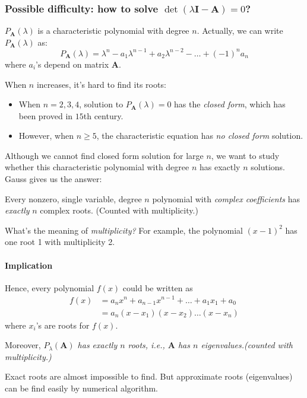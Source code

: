 \subsubsection{Possible difficulty: how to solve $\det(\lambda\bm I-\bm A)=0$?}
$P_{\bm A}(\lambda)$ is a characteristic polynomial with degree $n$. Actually, we can write $P_{\bm A}(\lambda)$ as:
\[
P_{\bm A}(\lambda)=\lambda^n-a_1\lambda^{n-1}+a_2\lambda^{n-2}-\dots+(-1)^{n}a_n
\]
where $a_i$'s depend on matrix $\bm A$.

When $n$ increases, it's hard to find its roots:
\begin{itemize}
\item
When $n=2,3,4$, solution to $P_{\bm A}(\lambda)=0$ has the \textit{closed form}, which has been proved in $15$th century.
\item
However, when $n\ge5$, the characteristic equation has \textit{no closed form} solution.
\end{itemize}

Although we cannot find closed form solution for large $n$, we want to study whether this characteristic polynomial with degree $n$ has exactly $n$ solutions. Gauss gives us the answer:
\begin{theorem}
Every nonzero, single variable, degree $n$ polynomial with \textit{complex coefficients} has \textit{exactly} $n$ complex roots. (Counted with multiplicity.)
\end{theorem}

What's the meaning of \textit{multiplicity?} For example, the polynomial $(x-1)^2$ has one root 1 with multiplicity 2.

\paragraph{Implication}
Hence, every polynomial $f(x)$ could be written as
\begin{align*}
f(x)&=a_nx^n+a_{n-1}x^{n-1}+\dots+a_1x_1+a_0\\
&=a_n(x-x_1)(x-x_2)\dots(x-x_n)
\end{align*}
where $x_i$'s are roots for $f(x)$.

Moreover, \emph{$P_{\lambda}(\bm A)$ has exactly $n$ roots, i.e., $\bm A$ has $n$ eigenvalues.(counted with multiplicity.)}
\begin{remark}
Exact roots are almost impossible to find. But approximate roots (eigenvalues) can be find easily by numerical algorithm.
\end{remark}
